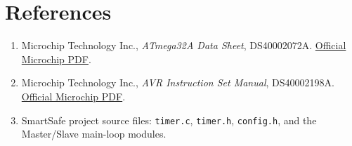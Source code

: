 \documentclass[11pt,a4paper]{article}
\begin{document}
\section*{References}
\begin{enumerate}
  \item Microchip Technology Inc., \textit{ATmega32A Data Sheet}, DS40002072A. \href{https://ww1.microchip.com/downloads/en/DeviceDoc/Atmega32A-DataSheet-Complete-DS40002072A.pdf}{Official Microchip PDF}.
  \item Microchip Technology Inc., \textit{AVR Instruction Set Manual}, DS40002198A. \href{https://ww1.microchip.com/downloads/en/DeviceDoc/AVR-Instruction-Set-Manual-DS40002198A.pdf}{Official Microchip PDF}.
  \item SmartSafe project source files: \texttt{timer.c}, \texttt{timer.h}, \texttt{config.h}, and the Master/Slave main-loop modules.
\end{enumerate}
\end{document}
